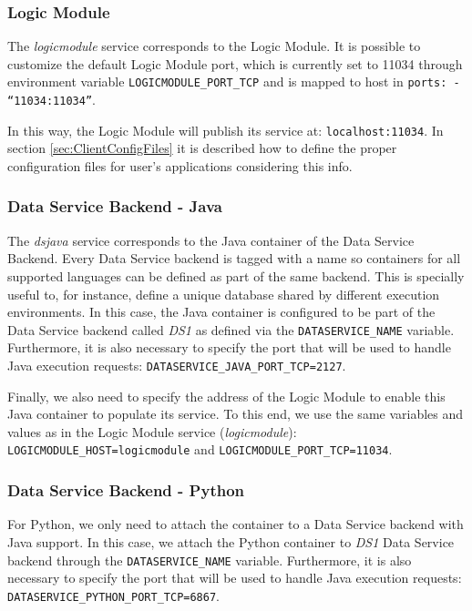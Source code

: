 \subsubsection{Logic Module}
The \textit{logicmodule}  service corresponds to the Logic Module. It is possible to customize the default Logic Module port, which is currently set to 11034 through environment variable \texttt{LOGICMODULE\_PORT\_TCP} and is mapped to host in \texttt{ports: - ``11034:11034''}. 

In this way, the Logic Module will publish its service at: \texttt{localhost:11034}. In section \ref{sec:ClientConfigFiles} it is described how to define the proper configuration files for user's applications considering this info.

\subsubsection{Data Service Backend - Java}
The \textit{dsjava}  service corresponds to the Java container of the Data Service Backend. Every Data Service backend is tagged with a name so containers for all supported languages can be defined as part of the same backend. This is specially useful to, for instance, define a unique database shared by different execution environments. In this case, the Java container is configured to be part of the Data Service backend called \textit{DS1} as defined via the \texttt{DATASERVICE\_NAME} variable. Furthermore, it is also necessary to specify the port that will be used to handle Java execution requests: \texttt{DATASERVICE\_JAVA\_PORT\_TCP=2127}.

Finally, we also need to specify the address of the Logic Module to enable this Java container to populate its service. To this end, we use the same variables and values as in the Logic Module service (\textit{logicmodule}): \texttt{LOGICMODULE\_HOST=logicmodule} and \texttt{LOGICMODULE\_PORT\_TCP=11034}.

\subsubsection{Data Service Backend - Python}
For Python, we only need to attach the container to a Data Service backend with Java support. In this case, we attach the Python container to \textit{DS1} Data Service backend through the \texttt{DATASERVICE\_NAME} variable. Furthermore, it is also necessary to specify the port that will be used to handle Java execution requests: \texttt{DATASERVICE\_PYTHON\_PORT\_TCP=6867}.


